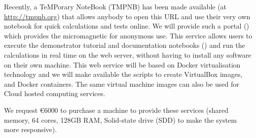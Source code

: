 \begin{workpackage}
\begin{tasklist}
\begin{task}[lead=USO,id=oommf-nb-ve,title=Online portal for
  micromagnetic VRE demonstrator,PM=3,partners={SR,JU},wphases=21-24]
  Recently, a TeMPorary \Jupyter NoteBook (TMPNB) has been made
  available (at \href{http://tmpnb.org}{http://tmpnb.org}) that allows
  anybody to open this URL and use their very own \Jupyter notebook
  for quick calculations and tests online. We will provide such a
  portal () which provides the
  micromagnetic \VRE for anonymous use. This service allows users to
  execute the demonstrator tutorial and documentation notebooks
  () and run the
  calculations in real time on the web server, without having to
  install any software on their own machine.  This web service will be
  based on Docker \cite{Docker} virtualisation technology and we will
  make available the scripts to create VirtualBox \cite{Virtualbox}
  images, and Docker containers. The same virtual machine images can
  also be used for Cloud hosted computing services.


  We request \euro{6000} to purchase a machine to provide these
  services (shared memory, 64 cores, 128GB RAM, Solid-state drive (SDD)
  to make the system more responsive).
\end{task}

\end{tasklist}


\end{workpackage}
